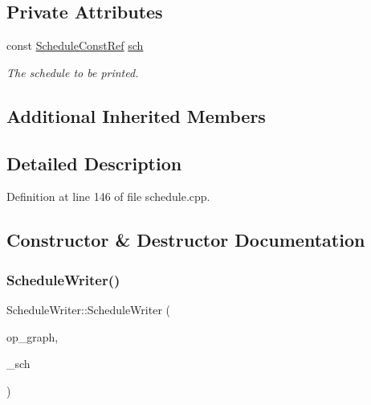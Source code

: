 \subsection*{Private Attributes}
\begin{DoxyCompactItemize}
\item 
const \hyperlink{schedule_8hpp_a85e4dea8a1611026193d8ca13fc5a260}{Schedule\+Const\+Ref} \hyperlink{classScheduleWriter_a3b318965422ea1d91f1ddd17708e07ef}{sch}
\begin{DoxyCompactList}\small\item\em The schedule to be printed. \end{DoxyCompactList}\end{DoxyCompactItemize}
\subsection*{Additional Inherited Members}


\subsection{Detailed Description}


Definition at line 146 of file schedule.\+cpp.



\subsection{Constructor \& Destructor Documentation}
\mbox{\label{classScheduleWriter_aaca4eeec6e15bab7f1c7e25924422440}} 
\subsubsection{\texorpdfstring{Schedule\+Writer()}{ScheduleWriter()}}
{\footnotesize\ttfamily Schedule\+Writer\+::\+Schedule\+Writer (\begin{DoxyParamCaption}\item[{const \hyperlink{op__graph_8hpp_a9a0b240622c47584bee6951a6f5de746}{Op\+Graph\+Const\+Ref}}]{op\+\_\+graph,  }\item[{const \hyperlink{schedule_8hpp_a85e4dea8a1611026193d8ca13fc5a260}{Schedule\+Const\+Ref}}]{\+\_\+sch }\end{DoxyParamCaption})\hspace{0.3cm}{\ttfamily [inline]}}



